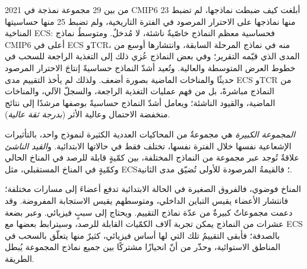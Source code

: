 \begin{dated}{2021}
من بين 29 مجموعة نمذجة في CMIP6 أبلغت كيف ضبطت نماذجها، لم تضبط 23 منها
نماذجها على الاحترار المرصود في الفترة التاريخية، ولم تضبط 25 منها
حساسيتها المناخية ECS: فحساسية معظم النماذج خاصّيةٌ ناشئة، لا مُدخلٌ.
ومتوسطُ نماذج CMIP6 أعلى في ECS وTCR،
منه في نماذج المرحلة السابقة، وانتشارها أوسع من المدى الذي قيّمه التقرير؛
وفي بعض النماذج عُزي ذلك إلى التغذية الراجعة
للسحب في خطوط العرض المتوسطة والعالية. وتُعيد أشدّ النماذج حساسيةً
إنتاجَ الاحترار المرصود حديثًا والمناخات الماضية بصورة أضعف.
ولذلك لم يأخذ التقييم مدى ECS وTCR من النماذج مباشرةً،
بل من فهم عمليات التغذية الراجعة،
والسجلّ الآلي، والمناخات الماضية، والقيود الناشئة؛ ويعامل أشدّ النماذج حساسيةً بوصفها مرشدًا إلى نتائج
منخفضة الاحتمال وعالية الأثر (\emph{بدرجة ثقة عالية}).
\end{dated}

\begin{definition}\label{def:b3:climate-models:evaluation}
\emph{المجموعة الكبيرة} هي مجموعةٌ من المحاكيات العددية
الكثيرة لنموذج واحد، بالتأثيرات الإشعاعية نفسها خلال الفترة نفسها، تختلف فقط
في حالاتها الابتدائية. و\emph{القيد الناشئ} علاقةٌ تُوجد
عبر مجموعة من النماذج المختلفة، بين كمّيةٍ قابلة للرصد في المناخ الحالي
وكمّيةٍ في المناخ المستقبلي، مثل ECS؛
فالقيمةُ المرصودة للأولى
تُضيّق مدى الثانية.
\end{definition}

المناخ فوضوي، فالفروق الصغيرة في الحالة الابتدائية تدفع أعضاءَ 
إلى مسارات مختلفة؛ فانتشار الأعضاء يقيس التباين الداخلي،
ومتوسطهم يقيس الاستجابة المفروضة. وقد دعمت مجموعاتٌ كبيرةٌ من عدّة نماذج التقييم.
ويحتاج  إلى سببٍ فيزيائي.
وعبر بضعة عشرات من النماذج يمكن تجربة آلاف الكمّيات القابلة للرصد،
وسيترابط بعضها مع ECS بالصدفة؛ فأبقى التقييمُ تلك التي لها أساس فيزيائي،
كثيرٌ منها يتعلّق بالسحب في المناطق الاستوائية،
وحذّر من أنّ انحيازًا مشتركًا بين جميع نماذج المجموعة
يُبطل الطريقة.

